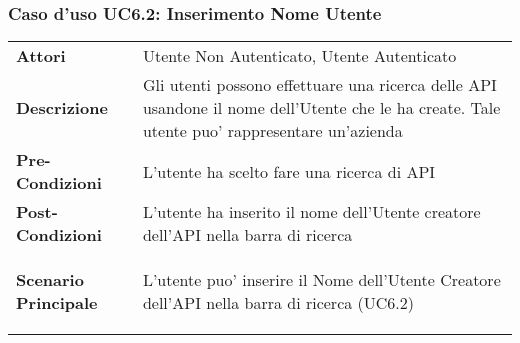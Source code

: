 \subsubsection{Caso d'uso UC6.2:  Inserimento Nome Utente}
\label{UC6_2}

\begin{tabular}{ l | p{11cm}}
	\hline
	\rowcolor{Gray}
	 \multicolumn{2}{c}{UC6.2 - Inserimento Nome Utente} \\
	 \hline
	\textbf{Attori} & Utente Non Autenticato, Utente Autenticato \\
	\textbf{Descrizione} & Gli utenti possono effettuare una ricerca delle API usandone il nome dell'Utente che le ha create. Tale utente puo' rappresentare un'azienda\\
	\textbf{Pre-Condizioni} & L'utente ha scelto fare una ricerca di API\\
	\textbf{Post-Condizioni} & L'utente ha inserito il nome dell'Utente creatore dell'API nella barra di ricerca \\
	\textbf{Scenario Principale} & 
	\begin{enumerate*}[label=(\arabic*.),itemjoin={\newline}]
		\item L'utente puo' inserire il Nome dell'Utente Creatore dell'API nella barra di ricerca (UC6.2)
	\end{enumerate*}\\
\end{tabular}